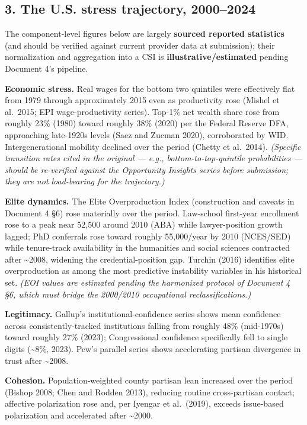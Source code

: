 \documentclass[
]{article}
\begin{document}
\subsection{3. The U.S. stress trajectory,
2000--2024}\label{the-u.s.-stress-trajectory-20002024}

The component-level figures below are largely \textbf{sourced reported
statistics} (and should be verified against current provider data at
submission); their normalization and aggregation into a CSI is
\textbf{illustrative/estimated} pending Document 4's pipeline.

\textbf{Economic stress.} Real wages for the bottom two quintiles were
effectively flat from 1979 through approximately 2015 even as
productivity rose (Mishel et al.~2015; EPI wage-productivity series).
Top-1\% net wealth share rose from roughly 23\% (1980) toward roughly
38\% (2020) per the Federal Reserve DFA, approaching late-1920s levels
(Saez and Zucman 2020), corroborated by WID. Intergenerational mobility
declined over the period (Chetty et al.~2014). \emph{(Specific
transition rates cited in the original --- e.g., bottom-to-top-quintile
probabilities --- should be re-verified against the Opportunity Insights
series before submission; they are not load-bearing for the
trajectory.)}

\textbf{Elite dynamics.} The Elite Overproduction Index (construction
and caveats in Document 4 §6) rose materially over the period.
Law-school first-year enrollment rose to a peak near 52,500 around 2010
(ABA) while lawyer-position growth lagged; PhD conferrals rose toward
roughly 55,000/year by 2010 (NCES/SED) while tenure-track availability
in the humanities and social sciences contracted after
\textasciitilde2008, widening the credential-position gap. Turchin
(2016) identifies elite overproduction as among the most predictive
instability variables in his historical set. \emph{(EOI values are
estimated pending the harmonized protocol of Document 4 §6, which must
bridge the 2000/2010 occupational reclassifications.)}

\textbf{Legitimacy.} Gallup's institutional-confidence series shows mean
confidence across consistently-tracked institutions falling from roughly
48\% (mid-1970s) toward roughly 27\% (2023); Congressional confidence
specifically fell to single digits (\textasciitilde8\%, 2023). Pew's
parallel series shows accelerating partisan divergence in trust after
\textasciitilde2008.

\textbf{Cohesion.} Population-weighted county partisan lean increased
over the period (Bishop 2008; Chen and Rodden 2013), reducing routine
cross-partisan contact; affective polarization rose and, per Iyengar et
al.~(2019), exceeds issue-based polarization and accelerated after
\textasciitilde2000.
\end{document}
